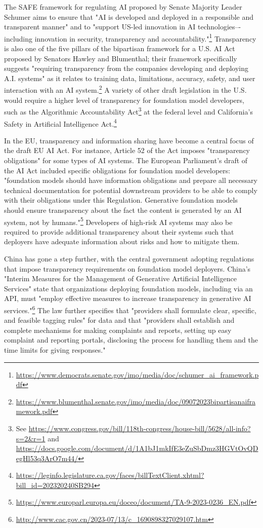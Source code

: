 The SAFE framework for regulating AI proposed by Senate Majority Leader Schumer aims to ensure that "AI is developed and deployed in a responsible and transparent manner" and to "support US-led innovation in AI technologies–-including innovation in security, transparency and accountability."\footnote{\url{https://www.democrats.senate.gov/imo/media/doc/schumer_ai_framework.pdf}}
Transparency is also one of the five pillars of the bipartisan framework for a U.S. AI Act proposed by Senators Hawley and Blumenthal; their framework specifically suggests "requiring transparency from the companies developing and deploying A.I. systems" as it relates to training data, limitations, accuracy, safety, and user interaction with an AI system.\footnote{\url{https://www.blumenthal.senate.gov/imo/media/doc/09072023bipartisanaiframework.pdf}}
A variety of other draft legislation in the U.S. would require a higher level of transparency for foundation model developers, such as the Algorithmic Accountability Act\footnote{See \url{https://www.congress.gov/bill/118th-congress/house-bill/5628/all-info?s=2&r=1} and \url{https://docs.google.com/document/d/1A1bJ1mkIfE3eZuSbDmz3HGVtOvQDegHl53q3ArO7m44/}} at the federal level and California's Safety in Artificial Intelligence Act.\footnote{\url{https://leginfo.legislature.ca.gov/faces/billTextClient.xhtml?bill_id=202320240SB294}} 


In the EU,  transparency and information sharing have become a central focus of the draft EU AI Act. 
For instance, Article 52 of the Act imposes "transparency obligations" for some types of AI systems.
The European Parliament's draft of the AI Act included specific obligations for foundation model developers: "foundation models should have information obligations and prepare all necessary technical  documentation for potential downstream providers to be able to comply with their obligations under this Regulation. Generative foundation models should ensure transparency about the fact the content is generated by an AI system, not by humans."\footnote{\url{https://www.europarl.europa.eu/doceo/document/TA-9-2023-0236_EN.pdf}}
Developers of high-risk AI systems may also be required to provide additional transparency about their systems such that deployers have adequate information about risks and how to mitigate them.

China has gone a step further, with the central government adopting regulations that impose transparency requirements on foundation model deployers. 
China's "Interim Measures for the Management of Generative Artificial Intelligence Services" state that organizations deploying foundation models, including via an API, must "employ effective measures to increase transparency in generative AI services."\footnote{\url{http://www.cac.gov.cn/2023-07/13/c_1690898327029107.htm}} 
The law further specifies that "providers shall formulate clear, specific, and feasible tagging rules" for data and that "providers shall establish and complete mechanisms for making complaints and reports, setting up easy complaint and reporting portals, disclosing the process for handling them and the time limits for giving responses."

